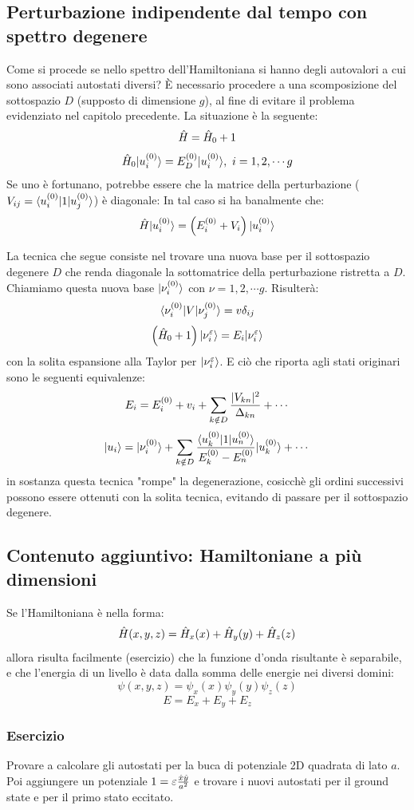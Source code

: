 \subsection{Perturbazione indipendente dal tempo con spettro degenere}
Come si procede se nello spettro dell'Hamiltoniana si hanno degli autovalori a cui sono associati autostati diversi? È necessario procedere a una scomposizione del sottospazio $D$ (supposto di dimensione $g$), al fine di evitare il problema evidenziato nel capitolo precedente. La situazione è la seguente:
\[
	\H = \H_0 + \V \]\[
	\H_0\Ket {u_i^{(0)}} = E_D^{(0)}\Ket {u_i^{(0)}}, \ i = 1, 2, \cdots g
\]
Se uno è fortunano, potrebbe essere che la matrice della perturbazione ($V_{ij} = \Bra {u_i^{(0)}} \V \Ket {u_j^{(0)}}$) è diagonale: In tal caso si ha banalmente che:
\[
	\H\Ket {u_i^{(0)}} = \l E_i^{(0)} + V_i \r \Ket {u_i^{(0)}}
\]

La tecnica che segue consiste nel trovare una nuova base per il sottospazio degenere $D$ che renda diagonale la sottomatrice della perturbazione ristretta a $D$. Chiamiamo questa nuova base $\Ket {\nu_i^{(0)}}$ con $\nu = 1, 2, \cdots g$. Risulterà:
\[
	\braketin{\nu_i^{(0)}}{V}{\nu_j^{(0)}} = v \delta_{ij} \]\[
	\l \H_0 + \V \r \Ket {\nu_i^{\varepsilon}} = E_i \Ket {\nu_i^{\varepsilon}}
\]
con la solita espansione alla Taylor per $\Ket {\nu_i^{\varepsilon}}$. E ciò che riporta agli stati originari sono le seguenti equivalenze:
\[
	E_i = E_i^{(0)} + v_i + \sum_{k \notin D} \frac{\sabs{V_{kn}}}{\Delta_{kn}} + \cdots \]\[
	\Ket {u_i} = \Ket {\nu_i^{(0)}} + \sum_{k \notin D} \frac{\Bra {u_k^{(0)}} \V \Ket {u_n^{(0)}}}{E_k^{(0)} - E_n^{(0)}} \Ket {u_k^{(0)}} + \cdots
\]
in sostanza questa tecnica "rompe" la degenerazione, cosicchè gli ordini successivi possono essere ottenuti con la solita tecnica, evitando di passare per il sottospazio degenere.

\subsection{Contenuto aggiuntivo: Hamiltoniane a più dimensioni}
Se l'Hamiltoniana è nella forma:
\[
	\H(x,y,z) = \H_x(x) + \H_y(y) + \H_z(z)
\]
allora risulta facilmente (esercizio) che la funzione d'onda risultante è separabile, e che l'energia di un livello è data dalla somma delle energie nei diversi domini:
\[
	\psi(x,y,z) = \psi_x(x) \psi_y(y) \psi_z(z)\]\[
	E = E_x + E_y + E_z
\]

\subsubsection*{Esercizio}
Provare a calcolare gli autostati per la buca di potenziale 2D quadrata di lato $a$. Poi aggiungere un potenziale $\V = \varepsilon\frac{\hat x\hat y}{a^2}$ e trovare i nuovi autostati per il ground state e per il primo stato eccitato.